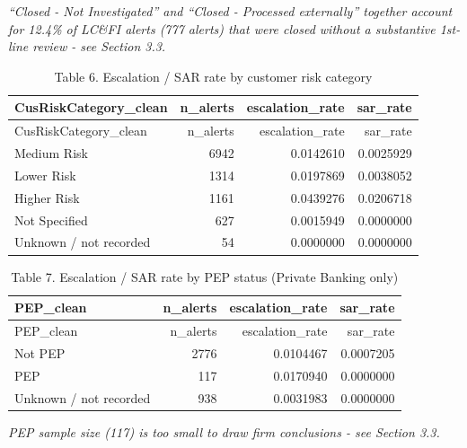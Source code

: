 \documentclass[
]{article}
\begin{document}
\emph{``Closed - Not Investigated'' and ``Closed - Processed
externally'' together account for 12.4\% of LC\&FI alerts (777 alerts)
that were closed without a substantive 1st-line review - see Section
3.3.}

\begin{longtable}[]{@{}lrrr@{}}
\caption{Table 6. Escalation / SAR rate by customer risk
category}\tabularnewline
\toprule\noalign{}
CusRiskCategory\_clean & n\_alerts & escalation\_rate & sar\_rate \\
\midrule\noalign{}
\endfirsthead
\toprule\noalign{}
CusRiskCategory\_clean & n\_alerts & escalation\_rate & sar\_rate \\
\midrule\noalign{}
\endhead
\bottomrule\noalign{}
\endlastfoot
Medium Risk & 6942 & 0.0142610 & 0.0025929 \\
Lower Risk & 1314 & 0.0197869 & 0.0038052 \\
Higher Risk & 1161 & 0.0439276 & 0.0206718 \\
Not Specified & 627 & 0.0015949 & 0.0000000 \\
Unknown / not recorded & 54 & 0.0000000 & 0.0000000 \\
\end{longtable}

\begin{longtable}[]{@{}lrrr@{}}
\caption{Table 7. Escalation / SAR rate by PEP status (Private Banking
only)}\tabularnewline
\toprule\noalign{}
PEP\_clean & n\_alerts & escalation\_rate & sar\_rate \\
\midrule\noalign{}
\endfirsthead
\toprule\noalign{}
PEP\_clean & n\_alerts & escalation\_rate & sar\_rate \\
\midrule\noalign{}
\endhead
\bottomrule\noalign{}
\endlastfoot
Not PEP & 2776 & 0.0104467 & 0.0007205 \\
PEP & 117 & 0.0170940 & 0.0000000 \\
Unknown / not recorded & 938 & 0.0031983 & 0.0000000 \\
\end{longtable}

\emph{PEP sample size (117) is too small to draw firm conclusions - see
Section 3.3.}
\end{document}
